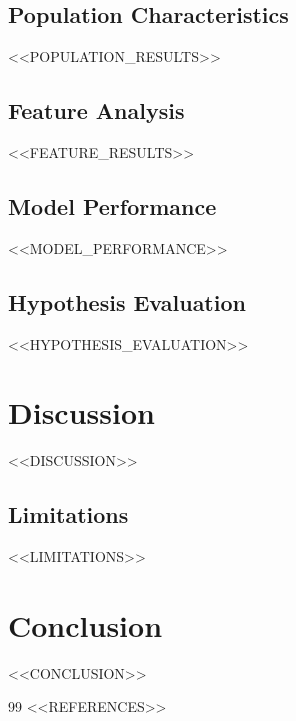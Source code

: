 \documentclass[conference]{IEEEtran}
\begin{document}
\subsection{Population Characteristics}
<<POPULATION_RESULTS>>

\subsection{Feature Analysis}
<<FEATURE_RESULTS>>

\subsection{Model Performance}
<<MODEL_PERFORMANCE>>

\subsection{Hypothesis Evaluation}
<<HYPOTHESIS_EVALUATION>>

\section{Discussion}
<<DISCUSSION>>

\subsection{Limitations}
<<LIMITATIONS>>

\section{Conclusion}
<<CONCLUSION>>

\begin{thebibliography}{99}
<<REFERENCES>>
\end{thebibliography}
\end{document}
